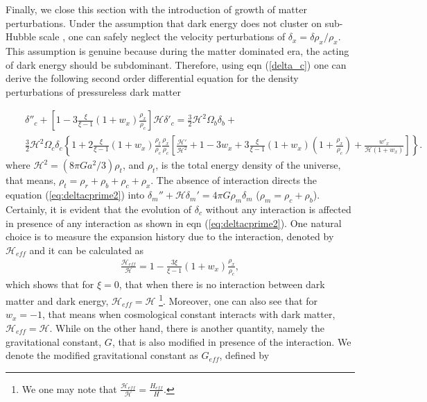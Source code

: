 \documentclass[superscriptaddress,oneolumn,secnumarabic,
amssymb,amsmath,nobibnotes,aps,prd,showpacs,nofootinbib]{revtex4}%
\begin{document}
Finally, we close this section with the introduction of growth of matter perturbations. Under the assumption that dark energy does not cluster on sub-Hubble scale \cite{Clemson:2011an}, one can safely neglect the velocity perturbations of $\delta_x = \delta \rho_x/\rho_x$. This assumption is genuine because during the matter dominated era, the acting of dark energy should be subdominant. Therefore, using eqn (\ref{delta_c})
one can derive the following second order differential equation for the density perturbations of pressureless dark matter

\begin{eqnarray}
&&\delta ''_c+\left[1-3\frac{\xi}{\xi-1}(1+w_x)\frac{\rho_x}{\rho_c}\right]\mathcal{H}\delta '_c
=\frac{3}{2}\mathcal{H}^2\Omega_b\delta_b + \nonumber \\
&&\frac{3}{2}\mathcal{H}^2\Omega_c\delta_c \left\{1+ 2\frac{\xi}{\xi-1}(1+w_x)\frac{\rho_{t}}{\rho_c}\frac{\rho_x}{\rho_c}
\left[ \frac{\mathcal{H}'}{\mathcal{H}^2}+1-3w_x+3\frac{\xi}{\xi-1}(1+w_x)\left(1+\frac{\rho_x}{\rho_c}\right)+\frac{w'_x}{\mathcal{H}(1+w_x)} \right] \right\}.
\label{eq:deltacprime2}
\end{eqnarray}
where $\mathcal{H}^2 = (8 \pi G a^2/3)\rho_t$, and
$\rho_t$, is the total energy density of the universe, that means, $\rho_t = \rho_r+\rho_b+\rho_c+\rho_x$. The absence of interaction directs the equation (\ref{eq:deltacprime2}) into $ \delta_m ''+\mathcal{H} \delta_m ' = 4 \pi G \rho_m \delta_m$ ($\rho_m = \rho_c +\rho_b$). Certainly, it is evident that the evolution of $\delta_c$ without any interaction is affected in presence of any interaction as shown in eqn (\ref{eq:deltacprime2}). 
One natural choice is to measure the expansion history due to the interaction, denoted by $\mathcal{H}_{eff}$ and it can be calculated as
\begin{eqnarray}
\frac{\mathcal{H}_{eff}}{\mathcal{H}}=1-\frac{3 \xi}{\xi-1}(1+w_x)\frac{\rho_x}{\rho_c},
\label{eq:Heff}
\end{eqnarray}
which shows that for $\xi= 0$, that when there is no interaction between dark matter and dark energy, $\mathcal{H}_{eff} = \mathcal{H}$ \footnote{We one may note that $\frac{\mathcal{H}_{eff}}{\mathcal{H}}=\frac{ H_{eff}}{H}$. }. Moreover, one can also see that for $w_x = -1$, that means when
cosmological constant interacts with dark matter, $\mathcal{H}_{eff} = \mathcal{H}$.
While on the other hand, there is another quantity, namely the
gravitational constant, $G$, that is also modified in presence of the interaction. We denote the modified gravitational constant as $G_{eff}$, defined by
\end{document}
